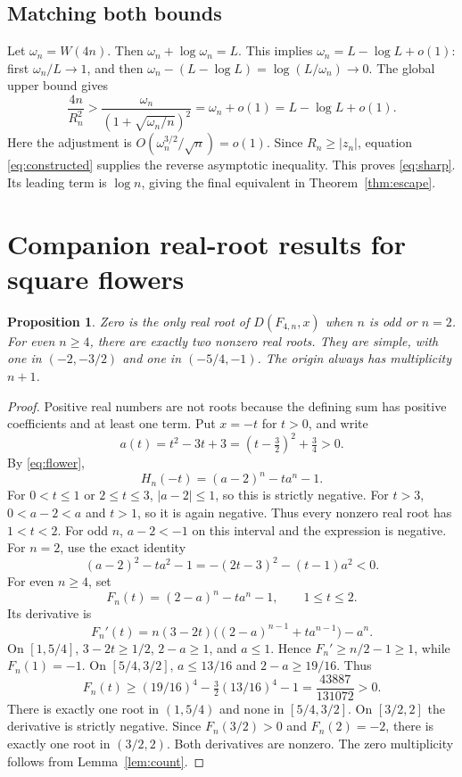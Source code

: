 \documentclass[11pt,a4paper]{article}
\newtheorem{proposition}[theorem]{Proposition}
\begin{document}
\subsection{Matching both bounds}
Let $\omega_n=W(4n)$. Then $\omega_n+\log\omega_n=L$.
This implies $\omega_n=L-\log L+o(1)$: first $\omega_n/L\to1$, and then
$\omega_n-(L-\log L)=\log(L/\omega_n)\to0$.
The global upper bound gives
\[
 \frac{4n}{R_n^2}>
 \frac{\omega_n}{(1+\sqrt{\omega_n/n})^2}
 =\omega_n+o(1)=L-\log L+o(1).
\]
Here the adjustment is $O(\omega_n^{3/2}/\sqrt n)=o(1)$.
Since $R_n\ge|z_n|$, equation \eqref{eq:constructed} supplies the reverse
asymptotic inequality. This proves \eqref{eq:sharp}.
Its leading term is $\log n$, giving the final equivalent in
Theorem~\ref{thm:escape}.

\section{Companion real-root results for square flowers}
\begin{proposition}\label{prop:flowerreal}
Zero is the only real root of $D(F_{4,n},x)$ when $n$ is odd or $n=2$.
For even $n\ge4$, there are exactly two nonzero real roots. They are simple,
with one in $(-2,-3/2)$ and one in $(-5/4,-1)$.
The origin always has multiplicity $n+1$.
\end{proposition}
\begin{proof}
Positive real numbers are not roots because the defining sum has positive
coefficients and at least one term. Put $x=-t$ for $t>0$, and write
\[
 a(t)=t^2-3t+3=(t-\tfrac32)^2+\tfrac34>0.
\]
By \eqref{eq:flower},
\[
 H_n(-t)=(a-2)^n-ta^n-1.
\]
For $0<t\le1$ or $2\le t\le3$, $|a-2|\le1$, so this is strictly negative.
For $t>3$, $0<a-2<a$ and $t>1$, so it is again negative.
Thus every nonzero real root has $1<t<2$.
For odd $n$, $a-2<-1$ on this interval and the expression is negative.
For $n=2$, use the exact identity
\[
 (a-2)^2-ta^2-1=-(2t-3)^2-(t-1)a^2<0.
\]
For even $n\ge4$, set
\[
 F_n(t)=(2-a)^n-ta^n-1,\qquad 1\le t\le2.
\]
Its derivative is
\[
 F_n'(t)=n(3-2t)\big((2-a)^{n-1}+ta^{n-1}\big)-a^n.
\]
On $[1,5/4]$, $3-2t\ge1/2$, $2-a\ge1$, and $a\le1$.
Hence $F_n'\ge n/2-1\ge1$, while $F_n(1)=-1$.
On $[5/4,3/2]$, $a\le13/16$ and $2-a\ge19/16$. Thus
\[
 F_n(t)\ge(19/16)^4-\tfrac32(13/16)^4-1
 =\frac{43887}{131072}>0.
\]
There is exactly one root in $(1,5/4)$ and none in $[5/4,3/2]$.
On $[3/2,2]$ the derivative is strictly negative.
Since $F_n(3/2)>0$ and $F_n(2)=-2$, there is exactly one root in $(3/2,2)$.
Both derivatives are nonzero. The zero multiplicity follows from
Lemma~\ref{lem:count}.
\end{proof}
\end{document}

